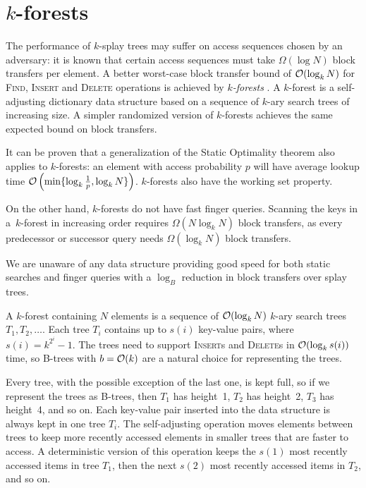 \chapter{$k$-forests}
\label{chapter:kforest}
The performance of $k$-splay trees may suffer on access sequences chosen
by an adversary: it is known that certain access sequences must
take $\Omega(\log N)$ block transfers per element.
A better worst-case block transfer bound of $\mathcal{O}(\log_k N)$ for \textsc{Find},
\textsc{Insert} and \textsc{Delete} operations is achieved by \emph{$k$-forests} \cite{martel}.
A $k$-forest is a self-adjusting dictionary data structure based on a sequence
of $k$-ary search trees of increasing size. A simpler randomized version
of $k$-forests achieves the same expected bound on block transfers.

It can be proven that a generalization of the Static Optimality theorem
also applies to $k$-forests: an element with access probability $p$
will have average lookup time $\mathcal{O}\left(\min\{\log_k \frac{1}{p}, \log_k
N\}\right)$. $k$-forests also have the working set property.

On the other hand, $k$-forests do not have fast finger queries. Scanning
the keys in a~\mbox{$k$-forest} in increasing order requires
$\Omega(N\log_k N)$ block transfers, as every predecessor or successor query
needs $\Omega(\log_k N)$ block transfers.

We are unaware of any data structure providing good speed for both static
searches and finger queries with a $\log_B$ reduction in block transfers
over splay trees.

A $k$-forest containing $N$ elements is a sequence of $\mathcal{O}(\log_k N)$ $k$-ary
search trees $T_1, T_2, \ldots$. Each tree $T_i$ contains up to $s(i)$ key-value
pairs, where $s(i) = k^{2^i} - 1$. The trees need to support \textsc{Insert}s
and \textsc{Delete}s in $\mathcal{O}(\log_k s(i))$ time, so \mbox{B-trees} with
$b=\mathcal{O}(k)$ are a natural choice for representing the trees.

Every tree, with the possible exception of the last one, is kept full,
so if we represent the trees as \mbox{B-trees}, then $T_1$ has height~1,
$T_2$ has height~2, $T_3$ has height~4, and so on.
Each key-value pair inserted into the data structure is always kept in one
tree $T_i$. The self-adjusting operation moves elements between trees to
keep more recently accessed elements in smaller trees that are faster
to access. A deterministic version of this operation keeps the $s(1)$ most
recently accessed items in tree $T_1$, then the next $s(2)$ most recently
accessed items in $T_2$, and so on.

